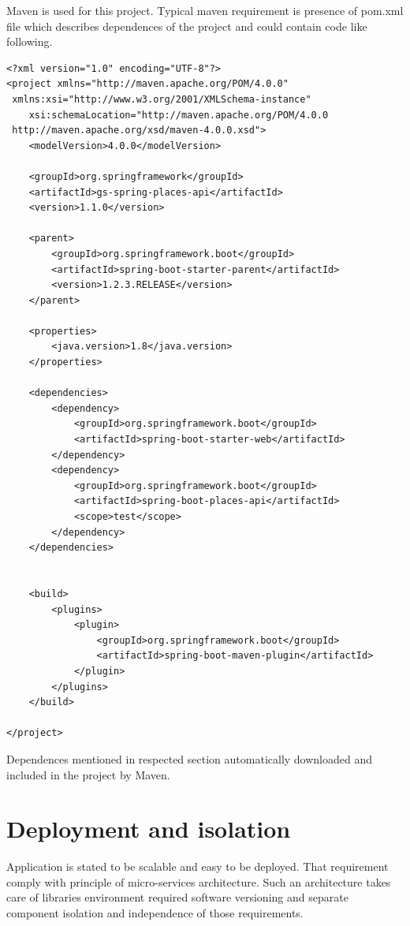 \documentclass[thesis=M,english]{FITthesis}[2012/10/20]
\begin{document}
Maven is used for this project. Typical maven requirement is presence of pom.xml file which describes dependences of the project and could contain code like following.

\begin{lstlisting}
<?xml version="1.0" encoding="UTF-8"?>
<project xmlns="http://maven.apache.org/POM/4.0.0"
 xmlns:xsi="http://www.w3.org/2001/XMLSchema-instance"
    xsi:schemaLocation="http://maven.apache.org/POM/4.0.0
 http://maven.apache.org/xsd/maven-4.0.0.xsd">
    <modelVersion>4.0.0</modelVersion>

    <groupId>org.springframework</groupId>
    <artifactId>gs-spring-places-api</artifactId>
    <version>1.1.0</version>

    <parent>
        <groupId>org.springframework.boot</groupId>
        <artifactId>spring-boot-starter-parent</artifactId>
        <version>1.2.3.RELEASE</version>
    </parent>

    <properties>
        <java.version>1.8</java.version>
    </properties>

    <dependencies>
        <dependency>
            <groupId>org.springframework.boot</groupId>
            <artifactId>spring-boot-starter-web</artifactId>
        </dependency>
        <dependency>
            <groupId>org.springframework.boot</groupId>
            <artifactId>spring-boot-places-api</artifactId>
            <scope>test</scope>
        </dependency>
    </dependencies>


    <build>
        <plugins>
            <plugin>
                <groupId>org.springframework.boot</groupId>
                <artifactId>spring-boot-maven-plugin</artifactId>
            </plugin>
        </plugins>
    </build>

</project>
\end{lstlisting}

Dependences mentioned in respected section automatically downloaded and included in the project by Maven.



\section{Deployment and isolation}

Application is stated to be scalable and easy to be deployed. That requirement comply with principle of micro-services architecture. Such an architecture takes care of libraries environment required software versioning and separate component isolation and independence of those requirements.
\end{document}
